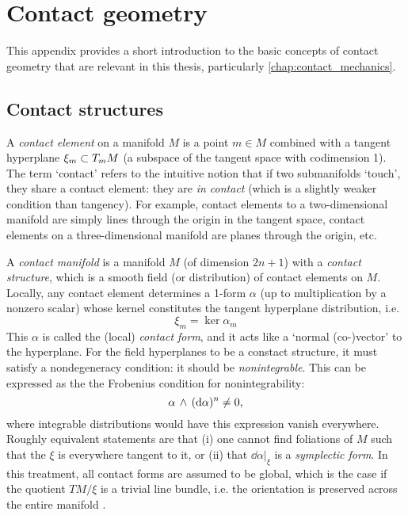 \chapter{Contact geometry}
This appendix provides a short introduction to the basic concepts of contact geometry that are relevant in this thesis, particularly \cref{chap:contact_mechanics}.

\section{Contact structures}
A \emph{contact element} on a manifold $M$ is a point $m \in M$ combined with a tangent hyperplane $\xi_m \subset T_mM$ (a subspace of the tangent space  with codimension 1). The term `contact' refers to the intuitive notion that if two submanifolds `touch', they share a contact element: they are \emph{in contact} (which is a slightly weaker condition than tangency). \cite{Cannas2001} For example, contact elements to a two-dimensional manifold are simply lines through the origin in the tangent space, contact elements on a three-dimensional manifold are planes through the origin, etc.

A \emph{contact manifold} is a manifold $M$ (of dimension $2n+1$) with a \emph{contact structure}, which is a smooth field (or distribution) of contact elements on $M$. Locally, any contact element determines a 1-form $\alpha$ (up to multiplication by a nonzero scalar) whose kernel constitutes the tangent hyperplane distribution, i.e. 
\begin{equation}
    \xi_m = \ker \alpha_m
    \label{eq:contact_form}
\end{equation}
This $\alpha$ is called the (local) \emph{contact form}, and it acts like a `normal (co-)vector' to the hyperplane. For the field hyperplanes to be a constact structure, it must satisfy a nondegeneracy condition: it should be \emph{nonintegrable}. This can be expressed as the the Frobenius condition for nonintegrability: \cite{Cannas2001,Abraham1978,Arnold1989}
$$  \alpha\,\wedge\,(\dd{\alpha})^n  \neq 0, $$
where integrable distributions would have this expression vanish everywhere. Roughly equivalent statements are that (i) one cannot find foliations of $M$ such that the $\xi$ is everywhere tangent to it, or (ii) that $\dd{\alpha}\vert_\xi$ is a \emph{symplectic form}. In this treatment, all contact forms are assumed to be global, which is the case if the quotient $TM/\xi$ is a trivial line bundle, i.e. the orientation is preserved across the entire manifold \cite{Geiges2008}.

